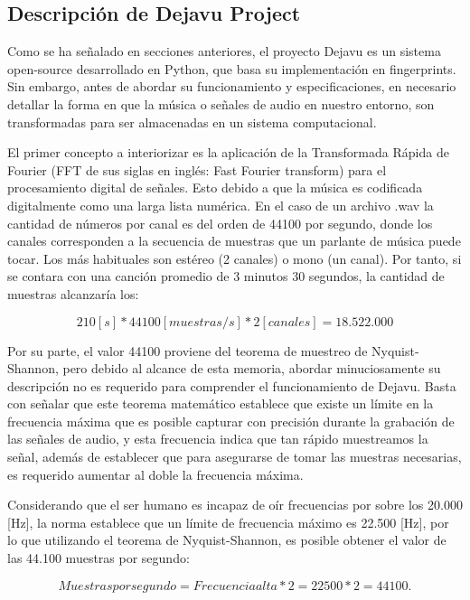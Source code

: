 \subsection{Descripción de Dejavu Project}
Como se ha señalado en secciones anteriores, el proyecto Dejavu es un sistema open-source desarrollado en Python, que basa su implementación en fingerprints. Sin embargo, antes de abordar su funcionamiento y especificaciones, en necesario detallar la forma en que la música o señales de audio en nuestro entorno, son transformadas para ser almacenadas en un sistema computacional.

\bigskip

El primer concepto a interiorizar es la aplicación de la Transformada Rápida de Fourier (FFT de sus siglas en inglés: Fast Fourier transform) para el procesamiento digital de señales. Esto debido a que la música es codificada digitalmente como una larga lista numérica. En el caso de un archivo .wav la cantidad de números por canal es del orden de 44100 por segundo, donde los canales corresponden a la secuencia de muestras que un parlante de música puede tocar. Los más habituales son estéreo (2 canales) o mono (un canal). Por tanto, si se contara con una canción promedio de 3 minutos 30 segundos, la cantidad de muestras alcanzaría los:

\begin{equation*}
210 [s]* 44100[muestras/s]*2[canales] = 18.522.000
\end{equation*}

Por su parte, el valor 44100 proviene del teorema de muestreo de Nyquist-Shannon, pero debido al alcance de esta memoria, abordar minuciosamente su descripción no es requerido para comprender el funcionamiento de Dejavu. Basta con señalar que este teorema matemático establece que existe un límite en la frecuencia máxima que es posible capturar con precisión durante la grabación de las señales de audio, y esta frecuencia indica que tan rápido muestreamos la señal, además de establecer que para asegurarse de tomar las muestras necesarias, es requerido aumentar al doble la frecuencia máxima. 

\bigskip

Considerando que el ser humano es incapaz de oír frecuencias por sobre los 20.000 [Hz], la norma establece que un límite de frecuencia máximo es 22.500 [Hz], por lo que utilizando el teorema de Nyquist-Shannon, es posible obtener el valor de las 44.100 muestras por segundo:

\begin{equation*}
Muestras por segundo = Frecuencia alta * 2 = 22500*2 = 44100.
\end{equation*}

